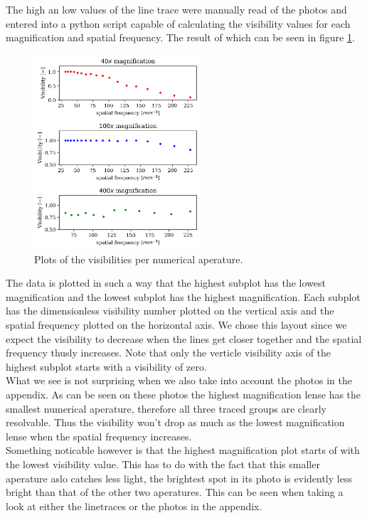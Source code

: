 The high an low values of the line trace were manually read of the photos and entered into a python script capable of calculating the visibility values for each magnification and spatial frequency. The result of which can be seen in figure \ref{fig:visibilities}.\\

\begin{figure}
    \centering
    \vspace{-3mm}
    \includegraphics[width=0.55\textwidth,keepaspectratio]{afbeeldingen/visibilities.png}
    \caption{Plots of the visibilities per numerical aperature.}
    \label{fig:visibilities}
    \vspace{0mm}
\end{figure}

\vspace{-7mm}
The data is plotted in such a way that the highest subplot has the lowest magnification and the lowest subplot has the highest magnification. Each subplot has the dimensionless visibility number plotted on the vertical axis and the spatial frequency plotted on the horizontal axis. We chose this layout since we expect the visibility to decrease when the lines get closer together and the spatial frequency thusly increases. Note that only the verticle visibility axis of the highest subplot starts with a visibility of zero.\\
What we see is not surprising when we also take into account the photos in the appendix. As can be seen on these photos the highest magnification lense has the smallest numerical aperature, therefore all three traced groups are clearly resolvable. Thus the visibility won't drop as much as the lowest magnification lense when the spatial frequency increases.\\
Something noticable however is that the highest magnification plot starts of with the lowest visibility value. This has to do with the fact that this smaller aperature aslo catches less light, the brightest spot in its photo is evidently less bright than that of the other two aperatures. This can be seen when taking a look at either the linetraces or the photos in the appendix.


